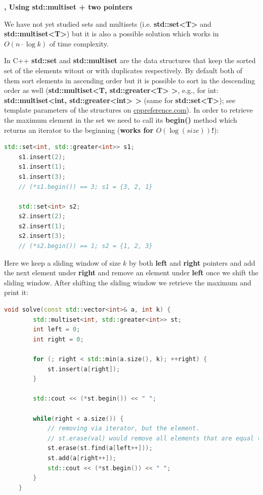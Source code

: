 \begin{solution}
    \textbf{, Using std::multiset + two pointers}

    We have not yet studied sets and multisets (i.e. \textbf{std::set<T>} and \textbf{std::multiset<T>}) but it is also a possible solution which works in $O(n \cdot \log{k})$ of time complexity.

    In C++ \textbf{std::set} and \textbf{std::multiset} are the data structures that keep the sorted set of the elements witout or with duplicates respectively. By default both of them sort elements in ascending order but it is possible to sort in the descending order as well (\textbf{std::multiset<T, std::greater<T> >}, e.g., for int: \textbf{std::multiset<int, std::greater<int> >} (same for \textbf{std::set<T>}); see template parameters of the structures on \href{https://cppreference.com}{cppreference.com}). In order to retrieve the maximum element in the set we need to call its \textbf{begin()} method which returns an iterator to the beginning (\textbf{works for $O(\log{(size)})$!}):

    \begin{lstlisting}[language=C++]
    std::set<int, std::greater<int>> s1;
    s1.insert(2);
    s1.insert(1);
    s1.insert(3);
    // (*s1.begin()) == 3; s1 = {3, 2, 1}

    std::set<int> s2;
    s2.insert(2);
    s2.insert(1);
    s2.insert(3);
    // (*s2.begin()) == 1; s2 = {1, 2, 3}
    \end{lstlisting}

    Here we keep a sliding window of size $k$ by both \textbf{left} and \textbf{right} pointers and add the next element under \textbf{right} and remove an element under \textbf{left} once we shift the sliding window. After shifting the sliding window we retrieve the maximum and print it:

    \begin{lstlisting}[language=C++]
    void solve(const std::vector<int>& a, int k) {
        std::multiset<int, std::greater<int>> st;
        int left = 0;
        int right = 0;

        for (; right < std::min(a.size(), k); ++right) {
            st.insert(a[right]);
        }

        std::cout << (*st.begin()) << " ";

        while(right < a.size()) {
            // removing via iterator, but the element.
            // st.erase(val) would remove all elements that are equal to 'val'
            st.erase(st.find(a[left++]));
            st.add(a[right++]);
            std::cout << (*st.begin()) << " ";
        }
    }
    \end{lstlisting}

\end{solution}





